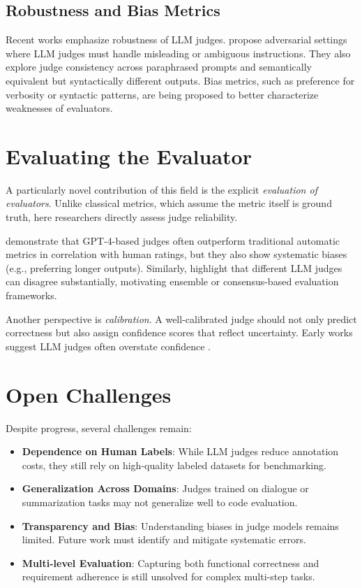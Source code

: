 \subsection{Robustness and Bias Metrics}
Recent works emphasize robustness of LLM judges. \citet{wang2023aligning} propose adversarial settings where LLM judges must handle misleading or ambiguous instructions. They also explore judge consistency across paraphrased prompts and semantically equivalent but syntactically different outputs. Bias metrics, such as preference for verbosity or syntactic patterns, are being proposed to better characterize weaknesses of evaluators.

\section{Evaluating the Evaluator}
A particularly novel contribution of this field is the explicit \textit{evaluation of evaluators}. Unlike classical metrics, which assume the metric itself is ground truth, here researchers directly assess judge reliability.

\citet{fu2023gptscore} demonstrate that GPT-4-based judges often outperform traditional automatic metrics in correlation with human ratings, but they also show systematic biases (e.g., preferring longer outputs). Similarly, \citet{wang2023aligning} highlight that different LLM judges can disagree substantially, motivating ensemble or consensus-based evaluation frameworks.

Another perspective is \textit{calibration}. A well-calibrated judge should not only predict correctness but also assign confidence scores that reflect uncertainty. Early works suggest LLM judges often overstate confidence \citep{zheng2023judgelm}.

\section{Open Challenges}
Despite progress, several challenges remain:

\begin{itemize}
    \item \textbf{Dependence on Human Labels}: While LLM judges reduce annotation costs, they still rely on high-quality labeled datasets for benchmarking.
    \item \textbf{Generalization Across Domains}: Judges trained on dialogue or summarization tasks may not generalize well to code evaluation.
    \item \textbf{Transparency and Bias}: Understanding biases in judge models remains limited. Future work must identify and mitigate systematic errors.
    \item \textbf{Multi-level Evaluation}: Capturing both functional correctness and requirement adherence is still unsolved for complex multi-step tasks.
\end{itemize}

